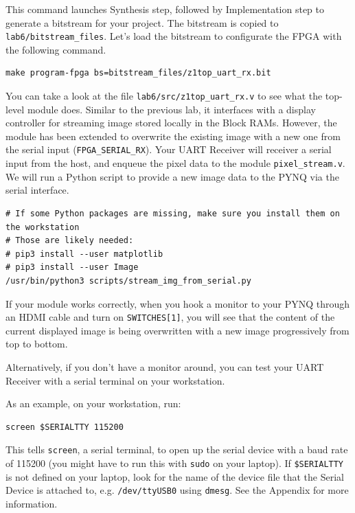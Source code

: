 \documentclass[11pt]{article}
\begin{document}
This command launches Synthesis step, followed by Implementation step to generate a bitstream for your project. The bitstream is copied to \verb|lab6/bitstream_files|. Let's load the bitstream to configurate the FPGA with the following command.

\begin{verbatim}
make program-fpga bs=bitstream_files/z1top_uart_rx.bit
\end{verbatim}

You can take a look at the file \verb|lab6/src/z1top_uart_rx.v| to see what the top-level module does. Similar to the previous lab, it interfaces with a display controller for streaming image stored locally in the Block RAMs. However, the module has been extended to overwrite the existing image with a new one from the serial input (\verb|FPGA_SERIAL_RX|). Your UART Receiver will receiver a serial input from the host, and enqueue the pixel data to the module \verb|pixel_stream.v|. We will run a Python script to provide a new image data to the PYNQ via the serial interface.

\begin{verbatim}
# If some Python packages are missing, make sure you install them on the workstation
# Those are likely needed:
# pip3 install --user matplotlib
# pip3 install --user Image
/usr/bin/python3 scripts/stream_img_from_serial.py
\end{verbatim}

If your module works correctly, when you hook a monitor to your PYNQ through an HDMI cable and turn on \verb|SWITCHES[1]|, you will see that the content of the current displayed image is being overwritten with a new image progressively from top to bottom.

Alternatively, if you don't have a monitor around, you can test your UART Receiver with a serial terminal on your workstation.

As an example, on your workstation, run:

\begin{verbatim}
screen $SERIALTTY 115200
\end{verbatim}

This tells \verb|screen|, a serial terminal, to open up the serial device with a baud rate of 115200 (you might have to run this with \verb|sudo| on your laptop). If \verb|$SERIALTTY| is not defined on your laptop, look for the name of the device file that the Serial Device is attached to, e.g. \verb|/dev/ttyUSB0| using \texttt{dmesg}. See the Appendix for more information.
\end{document}
